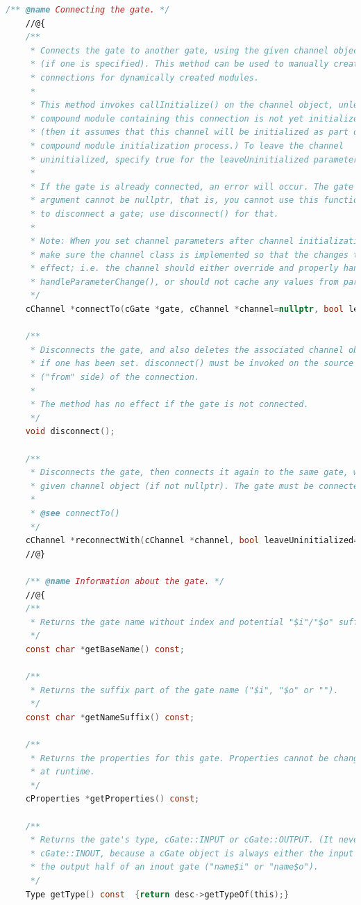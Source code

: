 \begin{lstlisting}[language=c]
    /** @name Connecting the gate. */
    //@{
    /**
     * Connects the gate to another gate, using the given channel object
     * (if one is specified). This method can be used to manually create
     * connections for dynamically created modules.
     *
     * This method invokes callInitialize() on the channel object, unless the
     * compound module containing this connection is not yet initialized
     * (then it assumes that this channel will be initialized as part of the
     * compound module initialization process.) To leave the channel
     * uninitialized, specify true for the leaveUninitialized parameter.
     *
     * If the gate is already connected, an error will occur. The gate
     * argument cannot be nullptr, that is, you cannot use this function
     * to disconnect a gate; use disconnect() for that.
     *
     * Note: When you set channel parameters after channel initialization,
     * make sure the channel class is implemented so that the changes take
     * effect; i.e. the channel should either override and properly handle
     * handleParameterChange(), or should not cache any values from parameters.
     */
    cChannel *connectTo(cGate *gate, cChannel *channel=nullptr, bool leaveUninitialized=false);

    /**
     * Disconnects the gate, and also deletes the associated channel object
     * if one has been set. disconnect() must be invoked on the source gate
     * ("from" side) of the connection.
     *
     * The method has no effect if the gate is not connected.
     */
    void disconnect();

    /**
     * Disconnects the gate, then connects it again to the same gate, with the
     * given channel object (if not nullptr). The gate must be connected.
     *
     * @see connectTo()
     */
    cChannel *reconnectWith(cChannel *channel, bool leaveUninitialized=false);
    //@}

    /** @name Information about the gate. */
    //@{
    /**
     * Returns the gate name without index and potential "$i"/"$o" suffix.
     */
    const char *getBaseName() const;

    /**
     * Returns the suffix part of the gate name ("$i", "$o" or "").
     */
    const char *getNameSuffix() const;

    /**
     * Returns the properties for this gate. Properties cannot be changed
     * at runtime.
     */
    cProperties *getProperties() const;

    /**
     * Returns the gate's type, cGate::INPUT or cGate::OUTPUT. (It never returns
     * cGate::INOUT, because a cGate object is always either the input or
     * the output half of an inout gate ("name$i" or "name$o").
     */
    Type getType() const  {return desc->getTypeOf(this);}


\end{lstlisting}
